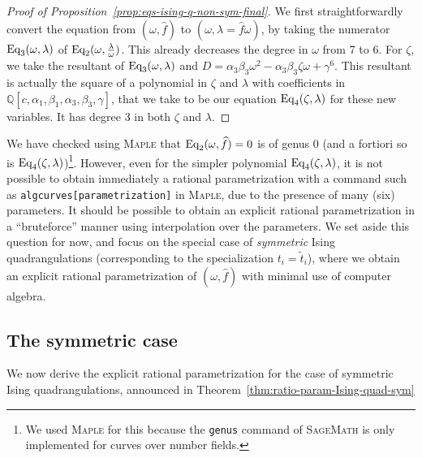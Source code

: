 \documentclass{scrartcl}
\newcommand{\Q}{\mathbb{Q}}
\newcommand\wt[1]{\widetilde{#1}}
\newcommand\wh[1]{\widehat{#1}}
\begin{document}
\begin{proof}[Proof of Proposition~\ref{prop:eqs-ising-q-non-sym-final}]
We first straightforwardly convert the equation from $(\omega,\wh{f})$ to $(\omega,\lambda=\wh{f}\omega)$, by taking the numerator $\textnormal{Eq}_3(\omega,\lambda)$ of $\textnormal{Eq}_2(\omega,\frac{\lambda}{\omega})$. This already decreases the degree in $\omega$ from 7 to 6. For $\zeta$, we take the resultant of $\textnormal{Eq}_3(\omega,\lambda)$ and $D=\alpha_3\beta_3\omega^2-\alpha_3\beta_3\zeta\omega+\gamma^6$. This resultant is actually the square of a polynomial in $\zeta$ and $\lambda$ with coefficients in $\Q[c,\alpha_1,\beta_1,\alpha_3,\beta_3,\gamma]$, that we take to be our equation $\textnormal{Eq}_4(\zeta,\lambda)$ for these new variables. It has degree 3 in both $\zeta$ and $\lambda$.
\end{proof}

We have checked using \textsc{Maple} that $\textnormal{Eq}_2(\omega,\wh{f})=0$ is of genus 0 (and a fortiori so is $\textnormal{Eq}_4(\zeta,\lambda)$)\footnote{We used \textsc{Maple} for this because the \texttt{genus} command of \textsc{SageMath} is only implemented for curves over number fields.}. However, even for the simpler polynomial $\textnormal{Eq}_4(\zeta,\lambda)$, it is not possible to obtain immediately a rational parametrization with a command such as \texttt{algcurves[parametrization]} in \textsc{Maple}, due to the presence of many (six) parameters. It should be possible to obtain an explicit rational parametrization in a ``bruteforce'' manner using interpolation over the parameters. We set aside this question for now, and focus on the special case of \emph{symmetric} Ising quadrangulations (corresponding to the specialization $t_i=\wt{t}_i$), where we obtain an explicit rational parametrization of $(\omega, \wh{f})$ with minimal use of computer algebra. 



\subsection{The symmetric case}
\label{sec:rat-param-ising-quads}

We now derive the explicit rational parametrization for the case of symmetric Ising quadrangulations, announced in Theorem~\ref{thm:ratio-param-Ising-quad-sym}
\end{document}
